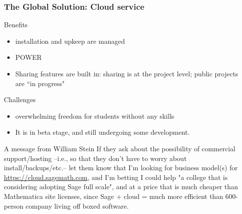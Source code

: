 \documentclass{beamer}
\begin{document}

\begin{frame}
\frametitle{The Global Solution: Cloud service}

\begin{block}{Benefits}
\begin{itemize}
\item installation and upkeep are managed
\item POWER
\item Sharing features are built in: sharing is at the project level; public projects are ``in progress"
\end{itemize}
\end{block}

\begin{block}{Challenges}
\begin{itemize}
\item overwhelming freedom for students without any skills
\item It is in beta stage, and still undergoing some development.
\end{itemize}
\end{block}

\end{frame}

\begin{frame}

\begin{block}{A message from William Stein}
If they ask about the possibility of commercial support/hosting --i.e., so that they don't have to worry about install/backups/etc.-- let them know that I'm looking for business model(s) for \url{https://cloud.sagemath.com}, and I'm betting I could help "a college that is considering adopting Sage full scale", and at a price that is much cheaper than Mathematica site licenses, since Sage + cloud = much more efficient than 600-person company living off boxed software.
\end{block}
\end{frame}
\end{document}
